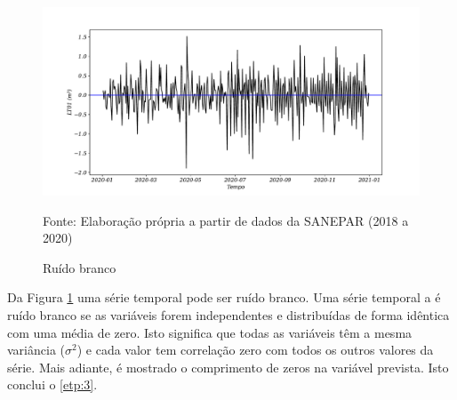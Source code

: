 \begin{figure}[H]
	\centering
	\caption{Ruído branco}
	\label{fig:ruido-branco}
	\includegraphics[width=0.9\linewidth]{Resultados/Figuras/ruido-branco}
	
	Fonte: Elaboração própria a partir de dados da SANEPAR (2018 a 2020)
\end{figure}

Da Figura \ref{fig:ruido-branco} uma série temporal pode ser ruído branco.
Uma série temporal a é ruído branco se as variáveis forem independentes e distribuídas de forma idêntica com uma média de zero.
Isto significa que todas as variáveis têm a mesma variância ($\sigma^2$) e cada valor tem correlação zero com todos os outros valores da série.
Mais adiante, é mostrado o comprimento de zeros na variável prevista. Isto conclui o \ref{etp:3}.